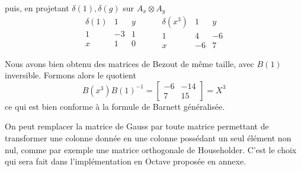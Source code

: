 \documentclass{standalone}
\begin{document}
puis, en projetant $\delta(1), \delta(g)$ sur $A_x \otimes A_y$
$$
\begin{array}{c|cc}
	\delta(1) & 1 & y \\
	\hline
	1 & -3 & 1 \\
	x & 1 & 0
\end{array}
\hspace{1cm}
\begin{array}{c|cc}
	\delta(x^3) & 1 & y \\
	\hline
	1 & 4 & -6  \\
	x & -6 & 7
\end{array}
$$

Nous avons bien obtenu des matrices de Bezout de même taille, avec $B(1)$ inversible. Formons alors le quotient
\begin{equation}
	B(x^3)B(1)^{-1} =
	\begin{bmatrix}
		-6 & -14 \\
		7 & 15
	\end{bmatrix}
	= X^3
\end{equation}
ce qui est bien conforme à la formule de Barnett généralisée.

\begin{rem}
On peut remplacer la matrice de Gauss par toute matrice permettant de transformer une colonne donnée en une colonne possédant un seul élément non nul, comme par exemple une matrice orthogonale de Householder. C'est le choix qui sera fait dans l'implémentation en Octave proposée en annexe.

\end{rem}

\end{document}
